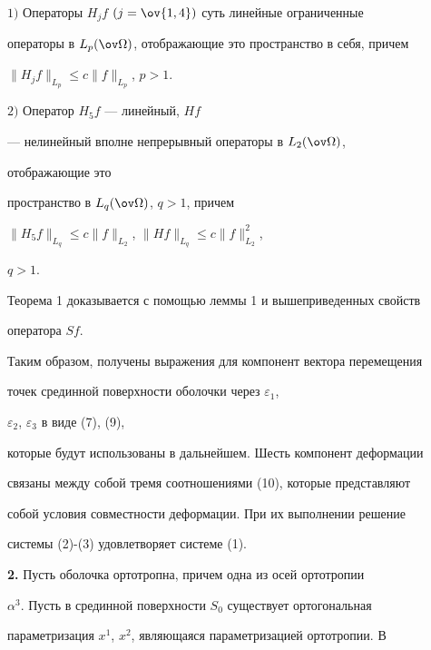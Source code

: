 \begin{thm} 


$1)$ Операторы $H_jf$ $(j=\ov{1,4})$ суть линейные ограниченные 


операторы в $L_p(\ov\Omega)$, отображающие это пространство в себя, причем 


$\|H_jf\|_{L_p}\le c\|f\|_{L_p}$, $p>1$. 


 


$2)$ Оператор $H_5f$ --- линейный, $Hf$ 


--- нелинейный вполне непрерывный операторы в $L_2(\ov\Omega)$, 


отображающие это 


пространство в $L_q(\ov\Omega)$, $q>1$, причем 


$\|H_5f\|_{L_q}\le c\|f\|_{L_2}$, $\|Hf\|_{L_q}\le c\|f\|^2_{L_2}$, 


$q>1$. 


\end{thm} 


 


Теорема 1 доказывается с помощью леммы 1 и вышеприведенных свойств 


оператора $Sf$. 


 


Таким образом, получены выражения для компонент вектора перемещения 


точек срединной поверхности оболочки через $\varepsilon_1$, 


$\varepsilon_2$, $\varepsilon_3$ в виде (7), (9), 


которые будут использованы в дальнейшем. Шесть компонент деформации 


связаны между собой тремя соотношениями (10), которые представляют 


собой условия совместности деформации. При их выполнении решение 


системы (2)-(3) удовлетворяет системе (1). 


\medskip 


 


{\bf 2.} Пусть оболочка ортотропна, причем одна из осей ортотропии 


$\alpha^3$. Пусть в срединной поверхности $S_0$ существует ортогональная 


параметризация $x^1$, $x^2$, являющаяся параметризацией ортотропии. В 


